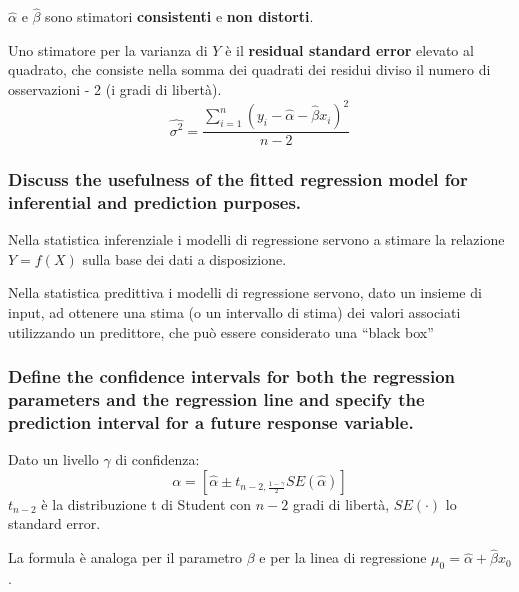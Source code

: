 \documentclass[
]{article}
\begin{document}
\(\hat{\alpha}\) e \(\hat{\beta}\) sono stimatori \textbf{consistenti} e
\textbf{non distorti}.

Uno stimatore per la varianza di \(Y\) è il \textbf{residual standard
error} elevato al quadrato, che consiste nella somma dei quadrati dei
residui diviso il numero di osservazioni - 2 (i gradi di libertà).
\[\hat{\sigma^2} = \frac{\sum_{i=1}^n (y_i - \hat{\alpha} - \hat{\beta}x_i)^2}{n-2} \]

\hypertarget{discuss-the-usefulness-of-the-fitted-regression-model-for-inferential-and-prediction-purposes.}{%
\subsubsection{Discuss the usefulness of the fitted regression model for
inferential and prediction
purposes.}\label{discuss-the-usefulness-of-the-fitted-regression-model-for-inferential-and-prediction-purposes.}}

Nella statistica inferenziale i modelli di regressione servono a stimare
la relazione \(Y=f(X)\) sulla base dei dati a disposizione.

Nella statistica predittiva i modelli di regressione servono, dato un
insieme di input, ad ottenere una stima (o un intervallo di stima) dei
valori associati utilizzando un predittore, che può essere considerato
una ``black box''

\hypertarget{define-the-confidence-intervals-for-both-the-regression-parameters-and-the-regression-line-and-specify-the-prediction-interval-for-a-future-response-variable.}{%
\subsubsection{Define the confidence intervals for both the regression
parameters and the regression line and specify the prediction interval
for a future response
variable.}\label{define-the-confidence-intervals-for-both-the-regression-parameters-and-the-regression-line-and-specify-the-prediction-interval-for-a-future-response-variable.}}

Dato un livello \(\gamma\) di confidenza:
\[ \alpha = \left[ \hat{\alpha} \pm t_{n-2,\frac{1-\gamma}{2}} SE(\hat{\alpha}) \right] \]
\(t_{n-2}\) è la distribuzione t di Student con \(n-2\) gradi di
libertà, \(SE(\cdot)\) lo standard error.

La formula è analoga per il parametro \(\beta\) e per la linea di
regressione \(\mu_0 = \hat{\alpha} + \hat{\beta}x_0\).
\end{document}
